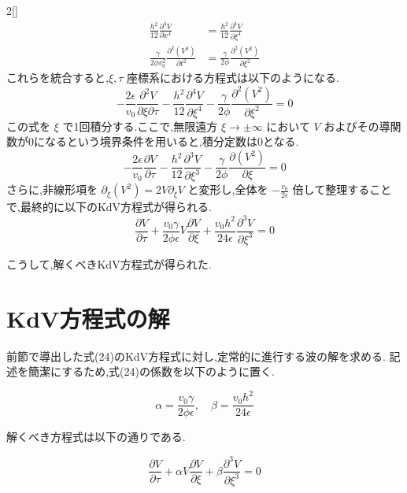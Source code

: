 \documentclass[a4paper,10pt]{article}
\begin{document}
\begin{multicols}{2}[\raggedcolumns]
\begin{align}
    \frac{h^2}{12}\frac{\partial^4 V}{\partial x^4} &= \frac{h^2}{12}\frac{\partial^4 V}{\partial \xi^4} \\
    \frac{\gamma}{2\phi v_0^2}\frac{\partial^2 (V^2)}{\partial t^2} &= \frac{\gamma}{2\phi}\frac{\partial^2 (V^2)}{\partial \xi^2}
\end{align}
これらを統合すると,$\xi, \tau$ 座標系における方程式は以下のようになる.
\begin{equation}
    -\frac{2\epsilon}{v_0} \frac{\partial^2 V}{\partial \xi \partial \tau} - \frac{h^2}{12}\frac{\partial^4 V}{\partial \xi^4} - \frac{\gamma}{2\phi}\frac{\partial^2 (V^2)}{\partial \xi^2} = 0
\end{equation}
この式を $\xi$ で1回積分する.ここで,無限遠方 $\xi \to \pm \infty$ において $V$ およびその導関数が0になるという境界条件を用いると,積分定数は0となる.
\begin{equation}
    -\frac{2\epsilon}{v_0} \frac{\partial V}{\partial \tau} - \frac{h^2}{12}\frac{\partial^3 V}{\partial \xi^3} - \frac{\gamma}{2\phi}\frac{\partial (V^2)}{\partial \xi} = 0
\end{equation}
さらに,非線形項を $\partial_\xi (V^2) = 2V \partial_\xi V$ と変形し,全体を $-\frac{v_0}{2\epsilon}$ 倍して整理することで,最終的に以下のKdV方程式が得られる.
\begin{equation}
    \frac{\partial V}{\partial \tau} + \frac{v_0 \gamma}{2\phi \epsilon} V \frac{\partial V}{\partial \xi} + \frac{v_0 h^2}{24 \epsilon} \frac{\partial^3 V}{\partial \xi^3} = 0
\end{equation}

こうして,解くべきKdV方程式が得られた.

\section{KdV方程式の解}
前節で導出した式(24)のKdV方程式に対し,定常的に進行する波の解を求める.
記述を簡潔にするため,式(24)の係数を以下のように置く.

\begin{equation}
    \alpha = \frac{v_0 \gamma}{2\phi \epsilon}, \quad \beta = \frac{v_0 h^2}{24 \epsilon}
\end{equation}

解くべき方程式は以下の通りである.

\begin{equation}
    \frac{\partial V}{\partial \tau} + \alpha V \frac{\partial V}{\partial \xi} + \beta \frac{\partial^3 V}{\partial \xi^3} = 0 \label{eq:simple_kdv}
\end{equation}


\end{multicols}
\end{document}
